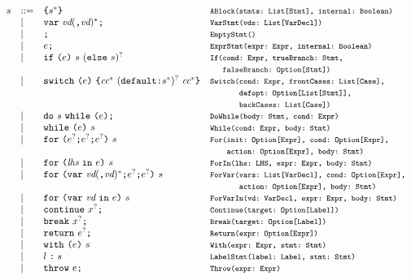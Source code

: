 \[\begin{array}{llll}
\stmt &::=& \verb+{+\stmt^*\verb+}+ & \mtt{ABlock(stmts:~List[Stmt], internal:~Boolean)}\\
& \mid & {\tt var} \ \vd(\verb+,+ \vd)^* \verb+;+ & \mtt{VarStmt(vds:~List[VarDecl])}\\
& \mid & \verb+;+ & \mtt{EmptyStmt()}\\
& \mid & \expr \verb+;+ & \mtt{ExprStmt(expr:~Expr, internal:~Boolean)}\\
& \mid & {\tt if} \ \verb+(+\expr\verb+)+ \ \stmt \ ({\tt else} \ \stmt)^?
& \mtt{If(cond:~Expr, trueBranch:~Stmt,}\\
&&&\mtt{\phantom{If(}falseBranch:~Option[Stmt])}\\
& \mid &  {\tt switch} \ \verb+(+\expr\verb+)+ \ \verb+{+\cc^* \ ({\tt default} \verb+:+ \stmt^{*})^? \ \cc^* \verb+}+
& \mtt{Switch(cond:~Expr, frontCases:~List[Case],}\\
&&&\mtt{\phantom{Switch(}defopt:~Option[List[Stmt]],}\\
&&&\mtt{\phantom{Switch(}backCases:~List[Case])}\\
& \mid & {\tt do} \ \stmt \ {\tt while} \ \verb+(+\expr\verb+)+ \verb+;+ & \mtt{DoWhile(body:~Stmt, cond:~Expr)}\\
  &\mid& {\tt while} \ \verb+(+\expr\verb+)+ \ \stmt & \mtt{While(cond:~Expr, body:~Stmt)}\\
  &\mid& {\tt for} \ \verb+(+\expr^?\verb+;+ \expr^?\verb+;+ \expr^? \verb+)+ \ \stmt
  & \mtt{For(init:~Option[Expr], cond:~Option[Expr],}\\
&&&\mtt{\phantom{For(}action:~Option[Expr], body:~Stmt)}\\
  &\mid& {\tt for} \ \verb+(+ \lhs \ {\tt in} \ \expr \verb+)+ \ \stmt & 
\mtt{ForIn(lhs:~LHS, expr:~Expr, body:~Stmt)}\\
  &\mid& {\tt for} \ \verb+(+{\tt var} \ \vd(\verb+,+ \vd)^*\verb+;+ \expr^?\verb+;+ \expr^?\verb+)+ \ \stmt
  & \mtt{ForVar(vars:~List[VarDecl], cond:~Option[Expr],}\\
&&&\mtt{\phantom{ForVar(}action:~Option[Expr], body:~Stmt)}\\
  &\mid& {\tt for} \ \verb+(+{\tt var} \ \vd \ {\tt in} \ \expr \verb+)+ \ \stmt & \mtt{ForVarIn(vd:~VarDecl, expr:~Expr, body:~Stmt)}\\
& \mid & {\tt continue} \  \myid^{?} \verb+;+ & \mtt{Continue(target:~Option[Label])}\\
& \mid & {\tt break} \  \myid^{?} \verb+;+ & \mtt{Break(target:~Option[Label])}\\
& \mid & {\tt return} \ \expr^? \verb+;+ & \mtt{Return(expr:~Option[Expr])}\\
& \mid & {\tt with} \ \verb+(+\expr\verb+)+ \ \stmt & \mtt{With(expr:~Expr, stmt:~Stmt)}\\
& \mid & l \; \verb+:+ \; \stmt & \mtt{LabelStmt(label:~Label, stmt:~Stmt)}\\
& \mid & {\tt throw} \ \expr \verb+;+ & \mtt{Throw(expr:~Expr)}\\


\end{array}\]
